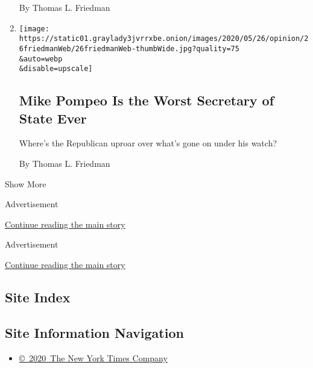 \begin{enumerate}
  By Thomas L. Friedman
\item
  \href{/2020/05/26/opinion/mike-pompeo.html}{}

  \texttt{[image: https://static01.graylady3jvrrxbe.onion/images/2020/05/26/opinion/26friedmanWeb/26friedmanWeb-thumbWide.jpg?quality=75\\\&auto=webp\\\&disable=upscale]}

  \hypertarget{mike-pompeo-is-the-worst-secretary-of-state-ever}{%
  \subsection{Mike Pompeo Is the Worst Secretary of State
  Ever}\label{mike-pompeo-is-the-worst-secretary-of-state-ever}}

  Where's the Republican uproar over what's gone on under his watch?

  By Thomas L. Friedman
\end{enumerate}

Show More

Advertisement

\protect\hyperlink{after-mid1}{Continue reading the main story}

Advertisement

\protect\hyperlink{after-mktg}{Continue reading the main story}

\hypertarget{site-index}{%
\subsection{Site Index}\label{site-index}}

\hypertarget{site-information-navigation}{%
\subsection{Site Information
Navigation}\label{site-information-navigation}}

\begin{itemize}
\tightlist
\item
  \href{https://help.nytimes3xbfgragh.onion/hc/en-us/articles/115014792127-Copyright-notice}{©~2020~The
  New York Times Company}
\end{itemize}

